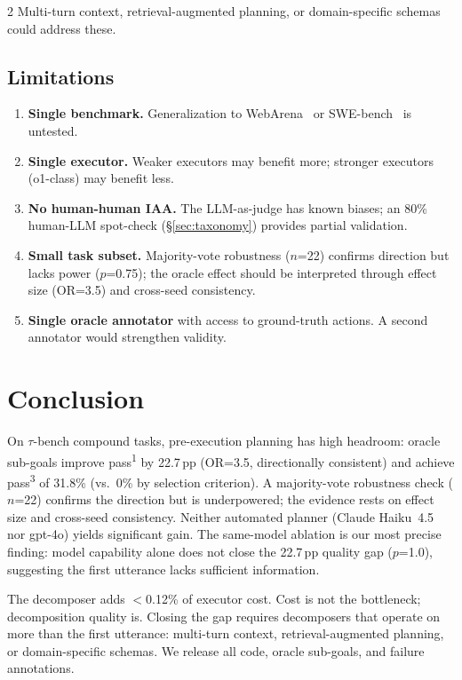 \documentclass[11pt,a4paper]{article}
\begin{document}
\begin{multicols}{2}
Multi-turn context, retrieval-augmented planning, or domain-specific schemas could address these.

\subsection{Limitations}

\begin{enumerate}
\item \textbf{Single benchmark.} Generalization to WebArena~\citep{zhou2024webarena} or SWE-bench~\citep{jimenez2024swebench} is untested.
\item \textbf{Single executor.} Weaker executors may benefit more; stronger executors (o1-class) may benefit less.
\item \textbf{No human-human IAA.} The LLM-as-judge has known biases; an 80\% human-LLM spot-check (\S\ref{sec:taxonomy}) provides partial validation.
\item \textbf{Small task subset.} Majority-vote robustness ($n$=22) confirms direction but lacks power ($p$=0.75); the oracle effect should be interpreted through effect size (OR=3.5) and cross-seed consistency.
\item \textbf{Single oracle annotator} with access to ground-truth actions. A second annotator would strengthen validity.
\end{enumerate}


\section{Conclusion}

On $\tau$-bench compound tasks, pre-execution planning has high headroom: oracle sub-goals improve pass\textsuperscript{1} by 22.7\,pp (OR=3.5, directionally consistent) and achieve pass\textsuperscript{3} of 31.8\% (vs.\ 0\% by selection criterion). A majority-vote robustness check ($n$=22) confirms the direction but is underpowered; the evidence rests on effect size and cross-seed consistency. Neither automated planner (Claude Haiku~4.5 nor gpt-4o) yields significant gain. The same-model ablation is our most precise finding: model capability alone does not close the 22.7\,pp quality gap ($p$=1.0), suggesting the first utterance lacks sufficient information.

The decomposer adds $<$0.12\% of executor cost. Cost is not the bottleneck; decomposition quality is. Closing the gap requires decomposers that operate on more than the first utterance: multi-turn context, retrieval-augmented planning, or domain-specific schemas. We release all code, oracle sub-goals, and failure annotations.


\end{multicols}
\end{document}
